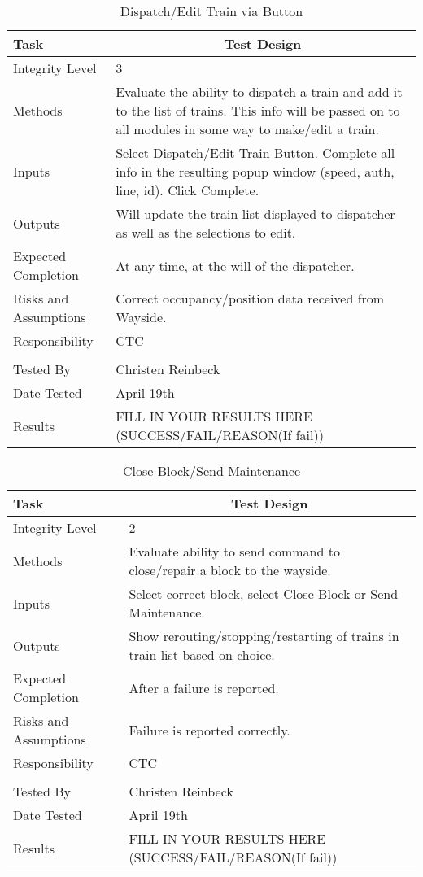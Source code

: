 \documentclass[]{article}
\begin{document}
 
\begin{table}[H]
	\centering
	\caption{Dispatch/Edit Train via Button}
	\begin{tabular}{|l|l|}
		\hline
		Task & \multicolumn{1}{c|}{Test Design} \\ \hline
		Integrity Level & 3 \\ \hline
		Methods & \parbox[t]{10cm}{Evaluate the ability to dispatch a train and add it to the list of trains. This info will be passed on to all modules in some way to make/edit a train.}\\ \hline
		Inputs &  \parbox[t]{10cm}{Select Dispatch/Edit Train Button. Complete all info in the resulting popup window (speed, auth, line, id). Click Complete.} \\ \hline
		Outputs &  \parbox[t]{10cm}{Will update the train list displayed to dispatcher as well as the selections to edit.} \\ \hline
		Expected Completion & At any time, at the will of the dispatcher. \\ \hline
		Risks and Assumptions & \parbox[t]{10cm}{Correct occupancy/position data received from Wayside.}  \\ \hline
		Responsibility & CTC\\ \hline
		\\ \hline
		Tested By   &  Christen Reinbeck\\	\hline
		Date Tested & \parbox[t]{10cm}{April 19th}\\ \hline
		Results & FILL IN YOUR RESULTS HERE (SUCCESS/FAIL/REASON(If fail))\\ \hline
	\end{tabular}
\end{table}

\begin{table}[H]
	\centering
	\caption{Close Block/Send Maintenance}
	\begin{tabular}{|l|l|}
		\hline
		Task & \multicolumn{1}{c|}{Test Design} \\ \hline
		Integrity Level & 2 \\ \hline
		Methods & \parbox[t]{10cm}{Evaluate ability to send command to close/repair a block to the wayside.}\\ \hline
		Inputs &  Select correct block, select Close Block or Send Maintenance. \\ \hline
		Outputs &  \parbox[t]{10cm}{Show rerouting/stopping/restarting of trains in train list based on choice.}\\ \hline
		Expected Completion & After a failure is reported.\\ \hline
		Risks and Assumptions & \parbox[t]{10cm}{Failure is reported correctly.} \\ \hline
		Responsibility & CTC\\ \hline
		\\ \hline
		Tested By   &  Christen Reinbeck\\	\hline
		Date Tested & \parbox[t]{10cm}{April 19th}\\ \hline
		Results & FILL IN YOUR RESULTS HERE (SUCCESS/FAIL/REASON(If fail))\\ \hline
	\end{tabular}
\end{table}
\end{document}
